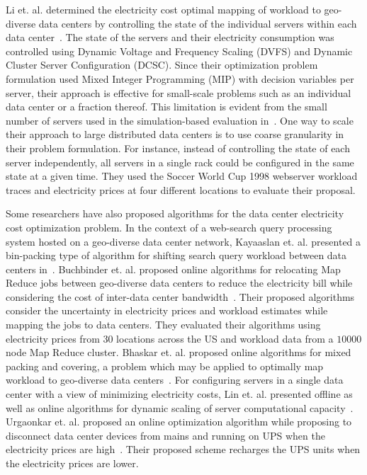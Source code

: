 Li et. al. determined the electricity cost optimal mapping of workload to geo-diverse data centers by controlling the state of the individual servers within each data center~\cite{Li:Optimal:TSG:2012}. The state of the servers and their electricity consumption was controlled using Dynamic Voltage and Frequency Scaling (DVFS) and Dynamic Cluster Server Configuration (DCSC). Since their optimization problem formulation used Mixed Integer Programming (MIP) with decision variables per server, their approach is effective for small-scale problems such as an individual data center or a fraction thereof. This limitation is evident from the small number of servers used in the simulation-based evaluation in~\cite{Li:Optimal:TSG:2012}. One way to scale their approach to large distributed data centers is to use coarse granularity in their problem formulation. For instance, instead of controlling the state of each server independently, all servers in a single rack could be configured in the same state at a given time. They used the Soccer World Cup 1998 webserver workload traces and electricity prices at four different locations to evaluate their proposal. 

Some researchers have also proposed algorithms for the data center electricity cost optimization problem. In the context of a web-search query processing system hosted on a geo-diverse data center network, Kayaaslan et. al. presented a bin-packing type of algorithm for shifting search query workload between data centers in~\cite{Kayaaslan:2011:EQP:2009916.2010047}. Buchbinder et. al. proposed online algorithms for relocating Map Reduce jobs between geo-diverse data centers to reduce the electricity bill while considering the cost of inter-data center bandwidth~\cite{Buchbinder:2011:OJR:2008780.2008798}. Their proposed algorithms consider the uncertainty in electricity prices and workload estimates while mapping the jobs to data centers. They evaluated their algorithms using electricity prices from $30$ locations across the US and workload data from a $10000$ node Map Reduce cluster. Bhaskar et. al. proposed online algorithms for mixed packing and covering, a problem which may be applied to optimally map workload to geo-diverse data centers~\cite{Bhaskar:2012:CoRR}. For configuring servers in a single data center with a view of minimizing electricity costs, Lin et. al. presented offline as well as online algorithms for dynamic scaling of server computational capacity~\cite{LinInfocom11}. Urgaonkar et. al. proposed an online optimization algorithm while proposing to disconnect data center devices from mains and running on UPS when the electricity prices are high~\cite{Urgaonkar:2011:OPC:1993744.1993766}. Their proposed scheme recharges the UPS units when the electricity prices are lower.


